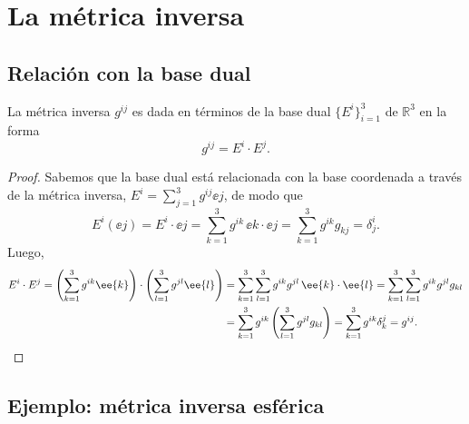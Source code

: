 \section{La métrica inversa}

\subsection{Relación con la base dual}

\begin{proposicion}
La métrica inversa $g^{ij}$ es dada en términos de la base dual $\{E^i\}_{i=1}^3$ de $\mathbb{R}^3$ en la forma
\begin{equation}
g^{ij} = E^i\cdot E^j .
\end{equation}
\end{proposicion}

\begin{proof}
Sabemos que la base dual está relacionada con la base coordenada a través de la métrica inversa, $E^i = \sum_{j=1}^3 g^{ij}\ee{j}$, de modo que
\begin{equation}
E^i(\ee{j}) = E^i\cdot\ee{j} = \sum_{k=1}^3 g^{ik}\,\ee{k}\cdot\ee{j} = \sum_{k=1}^3 g^{ik}g_{kj} = \delta^i_j .
\end{equation}
Luego,
\begin{align}
E^i\cdot E^j = \left(\sum_{k=1}^3 g^{ik}\ee{k}\right)\cdot\left(\sum_{l=1}^3 g^{jl}\ee{l}\right)
&= \sum_{k=1}^3\sum_{l=1}^3 g^{ik}g^{jl}\,\ee{k}\cdot\ee{l} = \sum_{k=1}^3\sum_{l=1}^3 g^{ik}g^{jl}g_{kl} \notag \\
&= \sum_{k=1}^3 g^{ik}\left(\sum_{l=1}^3 g^{jl}g_{kl}\right) = \sum_{k=1}^3 g^{ik}\delta^j_k = g^{ij} .
\end{align}
\end{proof}

\subsection{Ejemplo: métrica inversa esférica}

